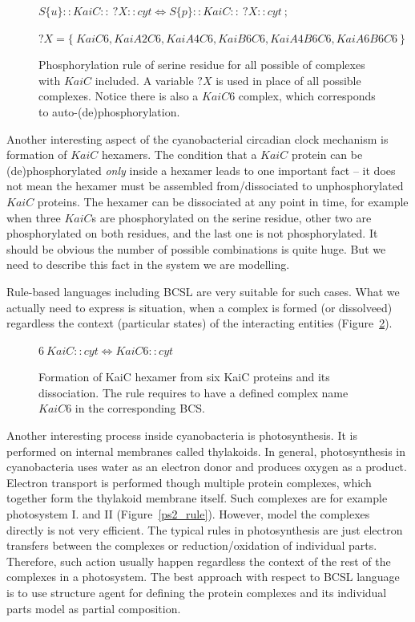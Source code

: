 \documentclass[12pt]{fithesis2}
\begin{document}
\begin{figure}[!h]
{\small
\begin{center}
$ S\{u\}::KaiC::~?X::cyt \Leftrightarrow S\{p\}::KaiC::~?X::cyt ~;~$

$ ?X = \{~KaiC6, KaiA2C6, KaiA4C6, KaiB6C6, KaiA4B6C6, KaiA6B6C6~\} $
\end{center}
}
\caption{Phosphorylation rule of serine residue for all possible of complexes with $KaiC$ included. A variable $?X$ is used in place of all possible complexes. Notice there is also a $KaiC6$ complex, which corresponds to auto-(de)phosphorylation.}\label{phospho_rule}
\end{figure}

Another interesting aspect of the cyanobacterial circadian clock mechanism is formation of $KaiC$ hexamers. The condition that a $KaiC$ protein can be (de)phosphorylated \emph{only} inside a hexamer leads to one important fact -- it does not mean the hexamer must be assembled from/dissociated to unphosphorylated $KaiC$ proteins. The hexamer can be dissociated at any point in time, for example when three $KaiC$s are phosphorylated on the serine residue, other two are phosphorylated on both residues, and the last one is not phosphorylated. It should be obvious the number of possible combinations is quite huge. But we need to describe this fact in the system we are modelling.

Rule-based languages including BCSL are very suitable for such cases. What we actually need to express is situation, when a complex is formed (or dissolveed) regardless the context (particular states) of the interacting entities (Figure~\ref{hexamer_rule}).

\begin{figure}[!h]
{\small
\begin{center}
$ 6 ~KaiC::cyt \Leftrightarrow KaiC6::cyt $
\end{center}
}
\caption{Formation of KaiC hexamer from six KaiC proteins and its dissociation. The rule requires to have a defined complex name $KaiC6$ in the corresponding BCS.}\label{hexamer_rule}
\end{figure}

Another interesting process inside cyanobacteria is photosynthesis. It is performed on internal membranes called thylakoids. In general, photosynthesis in cyanobacteria uses water as an electron donor and produces oxygen as a product. Electron transport is performed though multiple protein complexes, which together form the thylakoid membrane itself. Such complexes are for example photosystem I. and II (Figure~\ref{ps2_rule}). However, model the complexes directly is not very efficient. The typical rules in photosynthesis are just electron transfers between the complexes or reduction/oxidation of individual parts. Therefore, such action usually happen regardless the context of the rest of the complexes in a photosystem. The best approach with respect to BCSL language is to use structure agent for defining the protein complexes and its individual parts model as partial composition.
\end{document}
